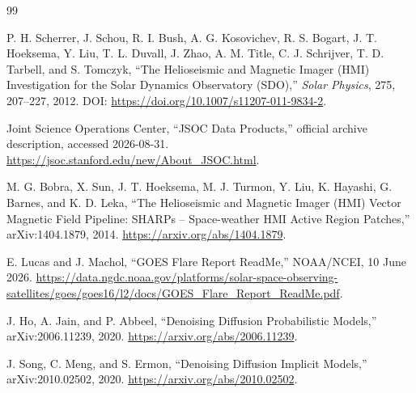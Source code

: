 \documentclass[11pt,oneside]{report}
\begin{document}
\begin{thebibliography}{99}

P. H. Scherrer, J. Schou, R. I. Bush, A. G. Kosovichev, R. S. Bogart, J. T. Hoeksema, Y. Liu, T. L. Duvall, J. Zhao, A. M. Title, C. J. Schrijver, T. D. Tarbell, and S. Tomczyk, ``The Helioseismic and Magnetic Imager (HMI) Investigation for the Solar Dynamics Observatory (SDO),'' \emph{Solar Physics}, 275, 207--227, 2012. DOI: \url{https://doi.org/10.1007/s11207-011-9834-2}.

Joint Science Operations Center, ``JSOC Data Products,'' official archive description, accessed 2026-08-31. \url{https://jsoc.stanford.edu/new/About_JSOC.html}.

M. G. Bobra, X. Sun, J. T. Hoeksema, M. J. Turmon, Y. Liu, K. Hayashi, G. Barnes, and K. D. Leka, ``The Helioseismic and Magnetic Imager (HMI) Vector Magnetic Field Pipeline: SHARPs -- Space-weather HMI Active Region Patches,'' arXiv:1404.1879, 2014. \url{https://arxiv.org/abs/1404.1879}.

E. Lucas and J. Machol, ``GOES Flare Report ReadMe,'' NOAA/NCEI, 10 June 2026. \url{https://data.ngdc.noaa.gov/platforms/solar-space-observing-satellites/goes/goes16/l2/docs/GOES_Flare_Report_ReadMe.pdf}.

J. Ho, A. Jain, and P. Abbeel, ``Denoising Diffusion Probabilistic Models,'' arXiv:2006.11239, 2020. \url{https://arxiv.org/abs/2006.11239}.

J. Song, C. Meng, and S. Ermon, ``Denoising Diffusion Implicit Models,'' arXiv:2010.02502, 2020. \url{https://arxiv.org/abs/2010.02502}.

\end{thebibliography}
\end{document}
